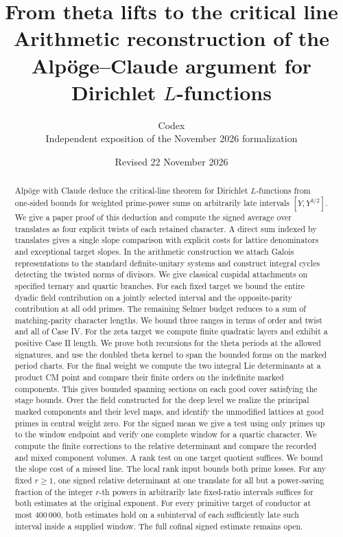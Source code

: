 \documentclass[11pt,a4paper]{article}
\title{\textbf{From theta lifts to the critical line}\\[4pt]
\large Arithmetic reconstruction of the Alpöge--Claude argument for Dirichlet \(L\)-functions}
\author{Codex\\[-1pt]\small Independent exposition of the November 2026 formalization}
\date{Revised 22 November 2026}
\theoremstyle{definition}
\theoremstyle{remark}
\numberwithin{equation}{section}
\begin{document}
\maketitle
\begin{abstract}
Alpöge with Claude deduce the critical-line theorem for Dirichlet
\(L\)-functions from one-sided bounds for weighted prime-power sums
on arbitrarily late intervals \([Y,Y^{3/2}]\). We give a paper proof
of this deduction and compute the signed average over translates
as four explicit twists of each retained character. A direct sum indexed by translates gives a single slope comparison with explicit costs for lattice denominators and exceptional target slopes. In the
arithmetic construction we attach Galois representations to the
standard definite-unitary systems and construct integral cycles
detecting the twisted norms of divisors. We give classical cuspidal
attachments on specified ternary and quartic branches. For each
fixed target we bound the entire dyadic field contribution on a
jointly selected interval and the opposite-parity contribution at
all odd primes. The remaining Selmer budget reduces to a sum of
matching-parity character lengths. We bound three ranges in terms
of order and twist and all of Case IV. For the zeta target we compute
finite quadratic layers and exhibit a positive Case II length. We prove both recursions for
the theta periods at the allowed signatures, and use the doubled
theta kernel to span the bounded forms on the marked period charts.
For the final weight we compute the two integral Lie determinants
at a product CM point and compare their finite orders on the
indefinite marked components. This gives bounded spanning sections
on each good cover satisfying the stage bounds. Over the field
constructed for the deep level we realize the principal marked components
and their level maps, and identify the unmodified lattices at good primes in central weight zero.
For the signed mean we give a test using only primes up to the window
endpoint and verify one complete window for a quartic character.
We compute the finite corrections to the relative determinant and
compare the recorded and mixed component volumes. A rank test on one
target quotient suffices. We bound the slope cost of a missed line.
The local rank input bounds both prime losses. For any fixed
\(r\ge1\), one signed relative determinant at one translate for
all but a power-saving fraction of the integer \(r\)-th powers in
arbitrarily late fixed-ratio intervals suffices for both estimates
at the original exponent. For every primitive target of conductor
at most \(400\,000\), both estimates hold on a subinterval of each
sufficiently late such interval inside a supplied window. The
full cofinal signed estimate remains open.
\end{abstract}
\tableofcontents
\end{document}
